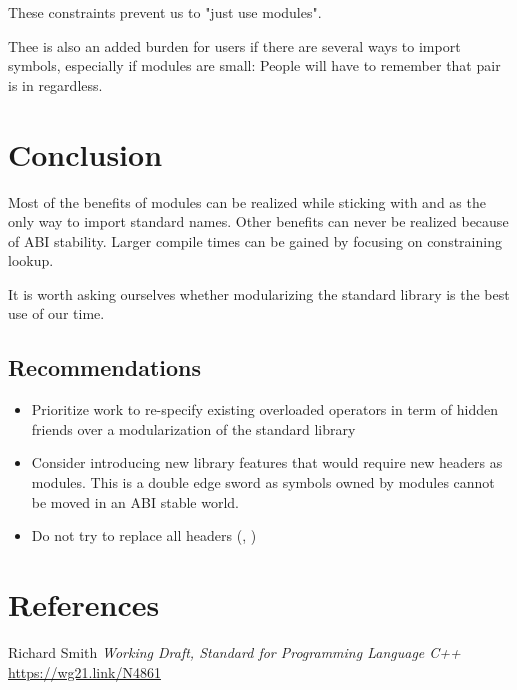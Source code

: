 \documentclass{wg21}
\begin{document}
These constraints prevent us to "just use modules".

Thee is also an added burden for users if there are several ways to import symbols, especially if modules are
small: People will have to remember that pair is in  regardless.


\section{Conclusion}

Most of the benefits of modules can be realized while sticking with  and 
as the only way to import standard names.
Other benefits can never be realized because of ABI stability.
Larger compile times can be gained by focusing on constraining lookup.

It is worth asking ourselves whether modularizing the standard library is the best use of our time.

\subsection{Recommendations}

\begin{itemize}
\item Prioritize work to re-specify existing overloaded operators in term of hidden friends over a modularization of the standard library
\item Consider introducing new library features that would require new headers as modules. This is a double edge sword as symbols owned by modules cannot be moved in an ABI stable world. 
\item Do not try to replace all headers (, )
\end{itemize}



\section{References}
\renewcommand{\section}[2]{}%



\begin{thebibliography}{9}

    Richard Smith
    \emph{Working Draft, Standard for Programming Language C++}\newline
    \url{https://wg21.link/N4861}

\end{thebibliography}
\end{document}
